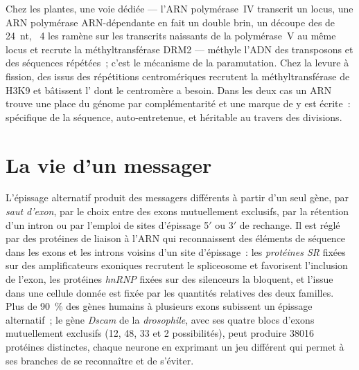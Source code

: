 \begin{proposition}\label{prop:b3:rna-regulation:rddm}
Chez les plantes, une voie dédiée --- l'ARN polymérase~IV transcrit un
locus, une ARN polymérase ARN-dépendante en fait un double brin, un
 découpe des  de \qty{24}{nt}, ~4 les ramène sur les
transcrits naissants de la polymérase~V au même locus et recrute la
méthyltransférase DRM2 --- méthyle l'ADN des transposons et des
séquences répétées~; c'est le mécanisme de la paramutation. Chez la
levure à fission, des  issus des répétitions centromériques
recrutent la méthyltransférase de H3K9 et bâtissent l'
dont le centromère a besoin. Dans les deux cas un ARN trouve une place
du génome par complémentarité et une marque de  y est
écrite~: spécifique de la séquence, auto-entretenue, et héritable au
travers des divisions.
\end{proposition}

\section{La vie d'un messager}

\begin{definition}\label{def:b3:rna-regulation:splicing}
L'épissage alternatif produit des messagers différents à partir d'un
seul gène, par \emph{saut d'exon}, par le choix entre des exons
mutuellement exclusifs, par la rétention d'un intron ou par l'emploi de
sites d'épissage 5$'$ ou 3$'$ de rechange. Il est réglé par des
protéines de liaison à l'ARN qui reconnaissent des éléments de séquence
dans les exons et les introns voisins d'un site d'épissage~: les
\emph{protéines SR} fixées sur des amplificateurs exoniques recrutent
le spliceosome et favorisent l'inclusion de l'exon, les protéines
\emph{hnRNP} fixées sur des silenceurs la bloquent, et l'issue dans une
cellule donnée est fixée par les quantités relatives des deux familles.
Plus de \qty{90}{\%} des gènes humains à plusieurs exons subissent un
épissage alternatif~; le gène \emph{Dscam} de la \emph{drosophile},
avec ses quatre blocs d'exons mutuellement exclusifs (12, 48, 33 et 2
possibilités), peut produire \num{38016} protéines distinctes, chaque
neurone en exprimant un jeu différent qui permet à ses branches de se
reconnaître et de s'éviter.
\end{definition}

